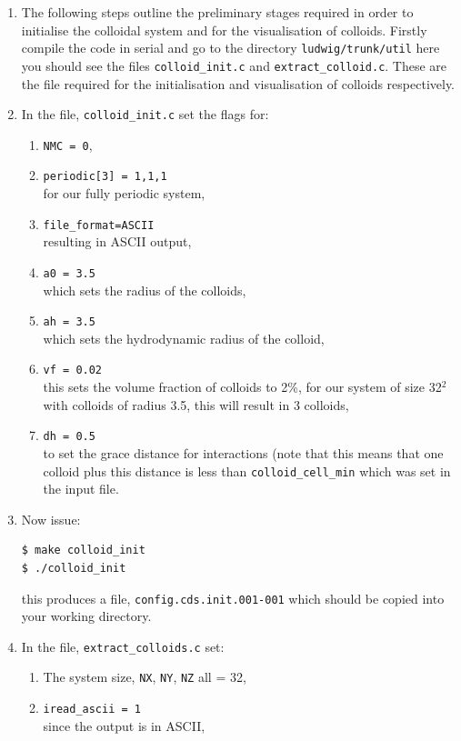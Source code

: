 \documentclass[11pt,twoside,a4paper]{article}
\begin{document}
\begin{enumerate}
\item The following steps outline the preliminary stages required in order to initialise the colloidal system and for the visualisation of colloids. Firstly compile the code in serial and go to the directory \texttt{ludwig/trunk/util} here you should see the files \texttt{colloid\_init.c} and \texttt{extract\_colloid.c}. These are the file required for the initialisation and visualisation of colloids respectively.
\item In the file, \texttt{colloid\_init.c} set the flags for:
\begin{enumerate}
\item \texttt{NMC = 0},
\item \texttt{periodic[3] = {1,1,1}} \\ for our fully periodic system,
\item \texttt{file\_format=ASCII} \\ resulting in ASCII output,
\item \texttt{a0 = 3.5} \\ which sets the radius of the colloids,
\item \texttt{ah = 3.5} \\ which sets the hydrodynamic radius of the colloid,
\item \texttt{vf = 0.02} \\ this sets the volume fraction of colloids to 2\%, for our system of size 32$^2$ with colloids of radius 3.5, this will result in 3 colloids,
\item \texttt{dh = 0.5} \\ to set the grace distance for interactions (note that this means that one colloid plus this distance is less than \texttt{colloid\_cell\_min} which was set in the input file.
\end{enumerate}
\item Now issue: \\
\begin{lstlisting}
$ make colloid_init
$ ./colloid_init
\end{lstlisting}
this produces a file, \texttt{config.cds.init.001-001} which should be copied into your working directory.
\item In the file, \texttt{extract\_colloids.c} set:
\begin{enumerate}
\item The system size, \texttt{NX},  \texttt{NY},  \texttt{NZ} all = 32,
\item \texttt{iread\_ascii = 1} \\ since the output is in ASCII,

\end{enumerate}
\end{enumerate}
\end{document}
